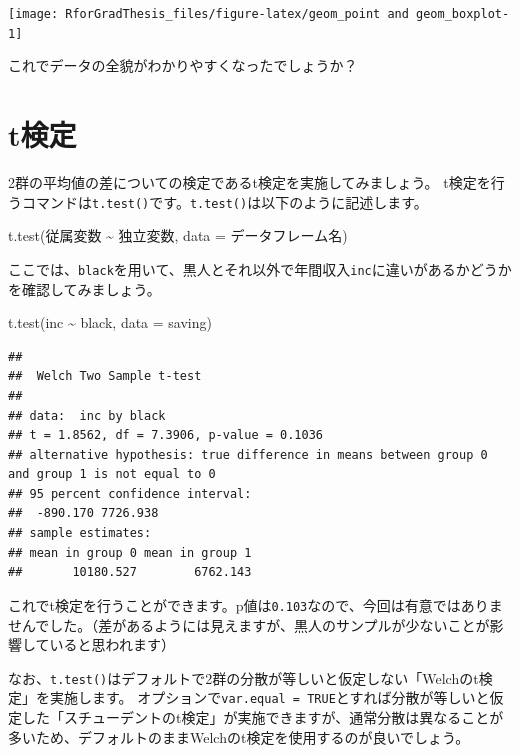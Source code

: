 \documentclass[
]{book}
\newenvironment{Shaded}{\begin{snugshade}}{\end{snugshade}}
\newcommand{\AttributeTok}[1]{\textcolor[rgb]{0.77,0.63,0.00}{#1}}
\newcommand{\FunctionTok}[1]{\textcolor[rgb]{0.00,0.00,0.00}{#1}}
\newcommand{\NormalTok}[1]{#1}
\newcommand{\SpecialCharTok}[1]{\textcolor[rgb]{0.00,0.00,0.00}{#1}}
\begin{document}
\begin{center}\texttt{[image: RforGradThesis\_files/figure-latex/geom\_point and geom\_boxplot-1]} \end{center}

これでデータの全貌がわかりやすくなったでしょうか？

\hypertarget{Ttest}{%
\chapter{t検定}\label{Ttest}}

2群の平均値の差についての検定であるt検定を実施してみましょう。
t検定を行うコマンドは\texttt{t.test()}です。\texttt{t.test()}は以下のように記述します。

\begin{Shaded}
\begin{Highlighting}[]
\FunctionTok{t.test}\NormalTok{(従属変数 }\SpecialCharTok{\textasciitilde{}}\NormalTok{ 独立変数, }\AttributeTok{data =}\NormalTok{ データフレーム名)}
\end{Highlighting}
\end{Shaded}

ここでは、\texttt{black}を用いて、黒人とそれ以外で年間収入\texttt{inc}に違いがあるかどうかを確認してみましょう。

\begin{Shaded}
\begin{Highlighting}[]
\FunctionTok{t.test}\NormalTok{(inc }\SpecialCharTok{\textasciitilde{}}\NormalTok{ black, }\AttributeTok{data =}\NormalTok{ saving)}
\end{Highlighting}
\end{Shaded}

\begin{verbatim}
## 
##  Welch Two Sample t-test
## 
## data:  inc by black
## t = 1.8562, df = 7.3906, p-value = 0.1036
## alternative hypothesis: true difference in means between group 0 and group 1 is not equal to 0
## 95 percent confidence interval:
##  -890.170 7726.938
## sample estimates:
## mean in group 0 mean in group 1 
##       10180.527        6762.143
\end{verbatim}

これでt検定を行うことができます。p値は\texttt{0.103}なので、今回は有意ではありませんでした。（差があるようには見えますが、黒人のサンプルが少ないことが影響していると思われます）

なお、\texttt{t.test()}はデフォルトで2群の分散が等しいと仮定しない「Welchのt検定」を実施します。
オプションで\texttt{var.equal\ =\ TRUE}とすれば分散が等しいと仮定した「スチューデントのt検定」が実施できますが、通常分散は異なることが多いため、デフォルトのままWelchのt検定を使用するのが良いでしょう。
\end{document}
